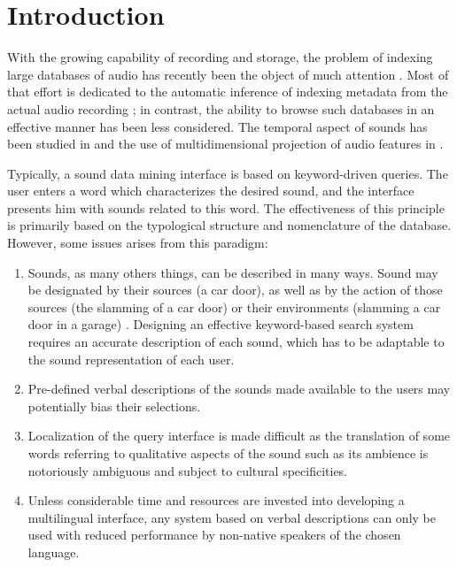 \documentclass{aes2e}
\begin{document}



\section{Introduction}

With the growing capability of recording and storage, the problem of indexing large databases of audio has recently been the object of much attention \cite{Wold1996}. Most of that effort is dedicated to the automatic inference of indexing metadata from the actual audio recording \cite{Zhang1999, Tzanetakis1999}; in contrast, the ability to browse such databases in an effective manner has been less considered. The temporal aspect of sounds has been studied in \cite{Kobayashi1997} and the use of multidimensional projection of audio features in \cite{Cano2002}.

Typically, a sound data mining interface is based on keyword-driven queries. The user enters a word which characterizes the desired sound, and the interface presents him with sounds related to this word. The effectiveness of this principle is primarily based on the typological structure and nomenclature of the database. However, some issues arises from this paradigm:

\begin{enumerate}
\item Sounds, as many others things, can be described in many ways. Sound may be designated by their
sources (a car door), as well as by the action of those sources (the slamming of a car door) or their environments (slamming a car door in a garage) \cite{houix2012lexical, niessen2010categories, brown2011towards}. Designing an effective keyword-based search system requires an accurate description of each sound, which has to be adaptable to the sound representation of each user.
\item Pre-defined verbal descriptions of the sounds made available to the users may potentially bias their selections.
\item Localization of the query interface is made difficult as the translation of some words referring to qualitative aspects of the sound such as its ambience is notoriously ambiguous and subject to cultural specificities.
\item Unless considerable time and resources are invested into developing a multilingual interface, any system based on verbal descriptions can only be used with reduced performance by non-native speakers of the chosen language.
\end{enumerate}
\end{document}
